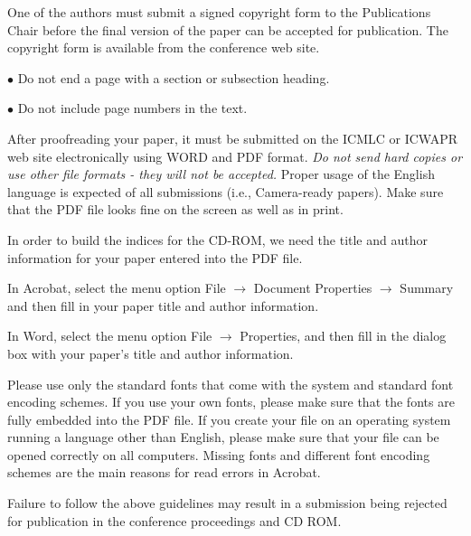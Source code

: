 \documentclass[a4paper, times, 10pt,twocolumn]{article}
\begin{document}
One of the authors must submit a signed copyright form to the
Publications Chair before the final version of the paper can be
accepted for publication. The copyright form is available from the
conference web site.

\hspace{-3ex}    $\bullet$ \hspace{1ex} Do not end a page with a
section or subsection heading.

 \hspace{-3ex}    $\bullet$ \hspace{1ex} Do not include page numbers in the text.



After proofreading your paper, it must be submitted on the ICMLC or ICWAPR web site electronically using WORD and PDF format.
{\it Do not send hard copies or use other file formats - they will
not be accepted.} Proper usage of the English language is expected
of all submissions (i.e., Camera-ready papers). Make sure that the
PDF file looks fine on the screen as well as in print.

In order to build the indices for the CD-ROM, we need the title and
author information for your paper entered into the PDF file.

In Acrobat, select the menu option File $\longrightarrow$ Document
Properties $\longrightarrow$ Summary and then fill in your paper
title and author information.

In Word, select the menu option File $\longrightarrow$ Properties,
and then fill in the dialog box with your paper's title and author
information.

Please use only the standard fonts that come with the system and
standard font encoding schemes. If you use your own fonts, please
make sure that the fonts are fully embedded into the PDF file. If
you create your file on an operating system running a language other
than English, please make sure that your file can be opened
correctly on all computers. Missing fonts and different font
encoding schemes are the main reasons for read errors in Acrobat.

Failure to follow the above guidelines may result in a submission
being rejected for publication in the conference proceedings and CD
ROM.

\newpage
\end{document}

